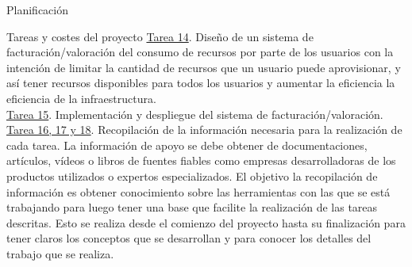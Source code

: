 \begin{chapter}{Planificación}
\begin{section}{Tareas y costes del proyecto}
\underline{Tarea 14}. Diseño de un sistema de facturación/valoración del consumo de recursos por parte de los usuarios con la intención de limitar la cantidad de recursos que un usuario puede aprovisionar, y así tener recursos disponibles para todos los usuarios y aumentar la eficiencia la eficiencia de la infraestructura.\\
\underline{Tarea 15}. Implementación y despliegue del sistema de facturación/valoración.\\
\underline{Tarea 16, 17 y 18}. Recopilación de la información necesaria para la realización de cada tarea. La información de apoyo se debe obtener de documentaciones, artículos, vídeos o libros de  fuentes fiables como empresas desarrolladoras de los productos utilizados o expertos especializados. El objetivo la recopilación de información es obtener conocimiento sobre las herramientas con las que se está trabajando para luego tener una base que facilite la realización de las tareas descritas. Esto se realiza desde el comienzo del proyecto hasta su finalización para tener claros los conceptos que se desarrollan y para conocer los detalles del trabajo que se realiza.\\

\end{section}
\end{chapter}
